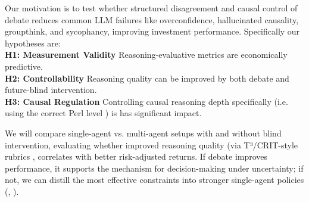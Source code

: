 \documentclass{article}
\begin{document}
Our motivation is to test whether structured disagreement and causal control of debate reduces common LLM failures like overconfidence, hallucinated causality, groupthink, and sycophancy, improving investment performance. Specifically our hypotheses are: \\
\textbf{H1: Measurement Validity} Reasoning-evaluative metrics are economically predictive. \\
\textbf{H2: Controllability} Reasoning quality can be improved by both debate and future-blind intervention. \\
\textbf{H3: Causal Regulation} Controlling causal reasoning depth specifically (i.e. using the correct Perl level \cite{pearl2009causality}) is has significant impact.

We will compare single-agent vs. multi-agent setups with and without blind intervention, evaluating whether improved reasoning quality (via T³/CRIT-style rubrics \cite{chang2023crit}, \cite{raudit} correlates with better risk-adjusted returns. If debate improves performance, it supports the mechanism for decision-making under uncertainty; if not, we can distill the most effective constraints into stronger single-agent policies (\cite{quantagents2025}, \cite{tradingagents2024}).



\end{document}
